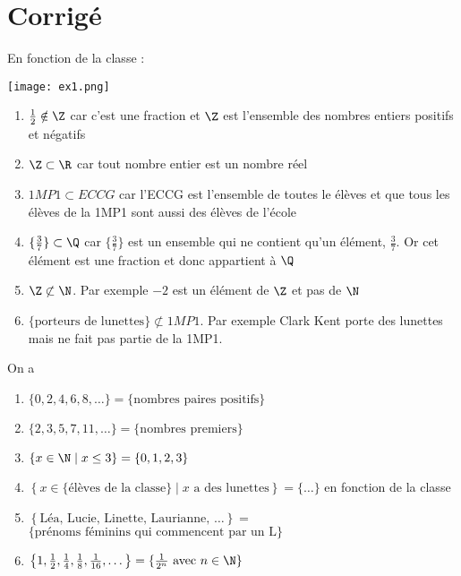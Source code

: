 \section{Corrigé}
\begin{solution}En fonction de la classe :
\begin{center}
\texttt{[image: ex1.png]}
\end{center}
\end{solution}

\begin{solution}
	\begin{enumerate}
	\item $\frac{1}{2} \notin \Z$ car c'est une fraction et $\Z$ est l'ensemble des nombres entiers positifs et négatifs
	\item $\Z \subset \R$ car tout nombre entier est un nombre réel
	\item $1MP1 \subset ECCG$ car l'ECCG est l'ensemble de toutes le élèves et que tous les élèves de la 1MP1 sont aussi des élèves de l'école
	\item $\{\frac{3}{7}\} \subset \Q$ car $\{\frac{3}{7}\}$ est un ensemble qui ne contient qu'un élément, $\frac{3}{7}$. Or cet élément est une fraction et donc appartient à $\Q$
	\item $\Z \not \subset \N$. Par exemple $-2$ est un élément de $\Z$ et pas de $\N$
	\item $\{\mbox{porteurs de lunettes}\} \not \subset 1MP1$. Par exemple Clark Kent porte des lunettes mais ne fait pas partie de la 1MP1.
	\end{enumerate}
\end{solution}

\begin{solution}On a
	\begin{enumerate}
	\item
	$
	\{0,2,4,6,8,\dots\} = \{\mbox{nombres paires positifs}\}
	$
	\item
	$
	\{2,3,5,7,11,\dots \} = \{\mbox{nombres premiers}\}
	$
	\item
	$
	\left\{ x\in \N \; | \; x\leq 3\right\} = \{0,1,2,3\}
	$
	\item
	$
	\left\{ x\in \{ \mbox{élèves de la classe} \} \; | \; x \mbox{ a des lunettes} \right\} = \{\dots\}
	$ en fonction de la classe
	\item
	$
	\left\{ \mbox{Léa, Lucie, Linette, Laurianne, } \dots \right\} =$\newline $ \{\mbox{prénoms féminins}\mbox{ qui commencent par un L}\}
	$
	\item 
	$
	\left\{1, \frac{1}{2}, \frac{1}{4}, \frac{1}{8}, \frac{1}{16}, \dots \right\} = \{\frac{1}{2^n} \mbox{ avec } n\in \N\}
	$
	\end{enumerate}
\end{solution}

